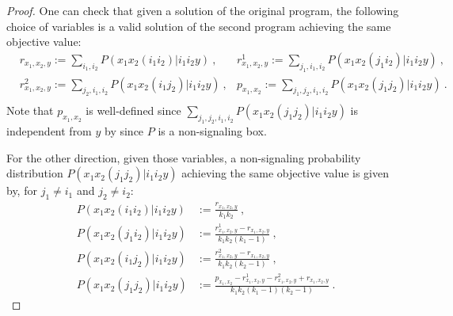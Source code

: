 \documentclass[11pt]{article}
\theoremstyle{definition}
\theoremstyle{remark}
\begin{document}
\begin{proof}
  One can check that given a solution of the original program, the following choice of variables is a valid solution of the second program achieving the same objective value:
\begin{equation}
  \begin{aligned}
    &r_{x_1,x_2,y} := \sum_{i_1,i_2} P(x_1x_2(i_1i_2)|i_1i_2y) \ , &r^1_{x_1,x_2,y} := \sum_{j_1,i_1,i_2} P(x_1x_2(j_1i_2)|i_1i_2y) \ ,\\
    &r^2_{x_1,x_2,y} := \sum_{j_2,i_1,i_2} P(x_1x_2(i_1j_2)|i_1i_2y) \ , &p_{x_1,x_2} := \sum_{j_1,j_2,i_1,i_2} P(x_1x_2(j_1j_2)|i_1i_2y) \ . \\
  \end{aligned}
\end{equation}
Note that $p_{x_1,x_2}$ is well-defined since $\sum_{j_1,j_2,i_1,i_2} P(x_1x_2(j_1j_2)|i_1i_2y)$ is independent from $y$ by since $P$ is a non-signaling box.

For the other direction, given those variables, a non-signaling probability distribution $P(x_1x_2(j_1j_2)|i_1i_2y)$ achieving the same objective value is given by, for $j_1 \not=i_1$ and $j_2 \not= i_2$:
\begin{equation}
  \begin{aligned}
    P(x_1x_2(i_1i_2)|i_1i_2y) &:= \frac{r_{x_1,x_2,y}}{k_1k_2} \ ,\\
    P(x_1x_2(j_1i_2)|i_1i_2y) &:= \frac{r^1_{x_1,x_2,y} - r_{x_1,x_2,y}}{k_1k_2(k_1-1)} \ ,\\
    P(x_1x_2(i_1j_2)|i_1i_2y) &:= \frac{r^2_{x_1,x_2,y} - r_{x_1,x_2,y}}{k_1k_2(k_2-1)} \ ,\\
    P(x_1x_2(j_1j_2)|i_1i_2y) &:= \frac{p_{x_1,x_2} -  r^1_{x_1,x_2,y} - r^2_{x_1,x_2,y} + r_{x_1,x_2,y}}{k_1k_2(k_1-1)(k_2-1)} \ .
  \end{aligned}
\end{equation}
\end{proof}
\end{document}
